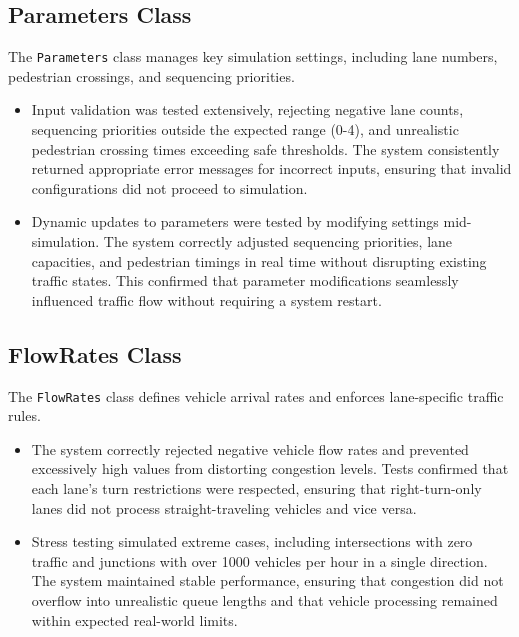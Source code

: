 \documentclass{article}
\begin{document}
\subsection*{Parameters Class}
The \texttt{Parameters} class manages key simulation settings, including lane numbers, pedestrian crossings, and sequencing priorities.  
\begin{itemize}
    \item Input validation was tested extensively, rejecting negative lane counts, sequencing priorities outside the expected range (0-4), and unrealistic pedestrian crossing times exceeding safe thresholds. The system consistently returned appropriate error messages for incorrect inputs, ensuring that invalid configurations did not proceed to simulation.
    \item Dynamic updates to parameters were tested by modifying settings mid-simulation. The system correctly adjusted sequencing priorities, lane capacities, and pedestrian timings in real time without disrupting existing traffic states. This confirmed that parameter modifications seamlessly influenced traffic flow without requiring a system restart.
\end{itemize}

\subsection*{FlowRates Class}
The \texttt{FlowRates} class defines vehicle arrival rates and enforces lane-specific traffic rules.  
\begin{itemize}
    \item The system correctly rejected negative vehicle flow rates and prevented excessively high values from distorting congestion levels. Tests confirmed that each lane’s turn restrictions were respected, ensuring that right-turn-only lanes did not process straight-traveling vehicles and vice versa.
    \item Stress testing simulated extreme cases, including intersections with zero traffic and junctions with over 1000 vehicles per hour in a single direction. The system maintained stable performance, ensuring that congestion did not overflow into unrealistic queue lengths and that vehicle processing remained within expected real-world limits.
\end{itemize}
\end{document}
